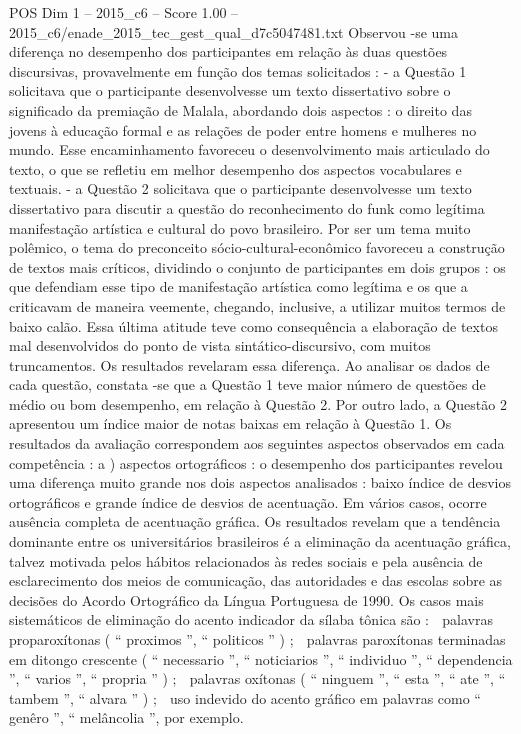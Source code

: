 \begin{textsample}{POS Dim 1 – 2015\_c6 – Score 1.00 – 2015\_c6/enade\_2015\_tec\_gest\_qual\_d7c5047481.txt}
Observou -se uma diferença no desempenho dos participantes em relação às duas questões discursivas, provavelmente em função dos temas solicitados : - a Questão 1 solicitava que o participante desenvolvesse um texto dissertativo sobre o significado da premiação de Malala, abordando dois aspectos : o direito das jovens à educação formal e as relações de poder entre homens e mulheres no mundo.
Esse encaminhamento favoreceu o desenvolvimento mais articulado do texto, o que se refletiu em melhor desempenho dos aspectos vocabulares e textuais. - a Questão 2 solicitava que o participante desenvolvesse um texto dissertativo para discutir a questão do reconhecimento do funk como legítima manifestação artística e cultural do povo brasileiro.
Por ser um tema muito polêmico, o tema do preconceito sócio-cultural-econômico favoreceu a construção de textos mais críticos, dividindo o conjunto de participantes em dois grupos : os que defendiam esse tipo de manifestação artística como legítima e os que a criticavam de maneira veemente, chegando, inclusive, a utilizar muitos termos de baixo calão.
Essa última atitude teve como consequência a elaboração de textos mal desenvolvidos do ponto de vista sintático-discursivo, com muitos truncamentos.
Os resultados revelaram essa diferença.
Ao analisar os dados de cada questão, constata -se que a Questão 1 teve maior número de questões de médio ou bom desempenho, em relação à Questão 2.
Por outro lado, a Questão 2 apresentou um índice maior de notas baixas em relação à Questão 1.
Os resultados da avaliação correspondem aos seguintes aspectos observados em cada competência : a ) aspectos ortográficos : o desempenho dos participantes revelou uma diferença muito grande nos dois aspectos analisados : baixo índice de desvios ortográficos e grande índice de desvios de acentuação.
Em vários casos, ocorre ausência completa de acentuação gráfica.
Os resultados revelam que a tendência dominante entre os universitários brasileiros é a eliminação da acentuação gráfica, talvez motivada pelos hábitos relacionados às redes sociais e pela ausência de esclarecimento dos meios de comunicação, das autoridades e das escolas sobre as decisões do Acordo Ortográfico da Língua Portuguesa de 1990.
Os casos mais sistemáticos de eliminação do acento indicador da sílaba tônica são :  palavras proparoxítonas ( “ proximos ”, “ politicos ” ) ;  palavras paroxítonas terminadas em ditongo crescente ( “ necessario ”, “ noticiarios ”, “ individuo ”, “ dependencia ”, “ varios ”, “ propria ” ) ;  palavras oxítonas ( “ ninguem ”, “ esta ”, “ ate ”, “ tambem ”, “ alvara ” ) ;  uso indevido do acento gráfico em palavras como “ genêro ”, “ melâncolia ”, por exemplo.

\end{textsample}
